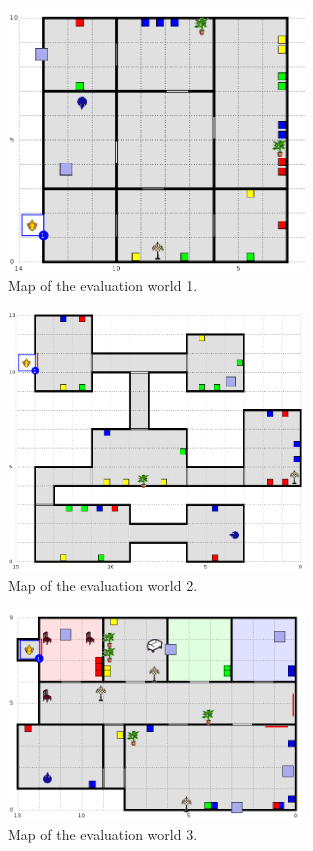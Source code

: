 \begin{figure}[!htbp]
  \centering
	\includegraphics[width=0.7\textwidth]{Images/experiment-world-2}
	\caption{Map of the evaluation world 1.}
	\label{fig:exper-world1}
\end{figure}

\begin{figure}[!htbp]
  \centering
	\includegraphics[width=0.7\textwidth]{Images/experiment-world-3}
	\caption{Map of the evaluation world 2.}
	\label{fig:exper-world2}
\end{figure}

\begin{figure}[!htbp]
  \centering
	\includegraphics[width=0.7\textwidth]{Images/experiment-world-4}
	\caption{Map of the evaluation world 3.}
	\label{fig:exper-world3}
\end{figure}

